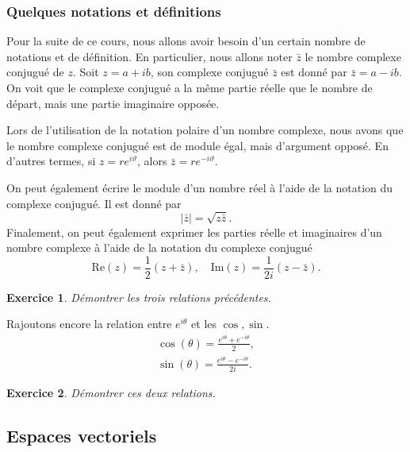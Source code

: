 \documentclass[a4paper,12pt]{book}
\newcommand{\zbar}{\bar{z}}
\renewcommand{\Re}{\mathrm{Re}}
\renewcommand{\Im}{\mathrm{Im}}
\newtheorem*{exercice}{Exercice}
\begin{document}
\subsubsection{Quelques notations et définitions}

Pour la suite de ce cours, nous allons avoir besoin d'un certain nombre 
de notations et de définition. En particulier, nous allons noter $\bar{z}$
le nombre complexe conjugu\'e de $z$. Soit $z=a+ib$, son complexe conjugué $\zbar$
est donné par $\zbar=a-ib$. On voit que le complexe conjugué a la même partie réelle
que le nombre de départ, mais une partie imaginaire opposée. 

Lors de l'utilisation de la notation polaire d'un nombre complexe, nous avons que le nombre complexe conjugué est 
de module égal, mais 
d'argument opposé. En d'autres termes, si $z=re^{i\vartheta}$, alors $\zbar=re^{-i\vartheta}$.


On peut également écrire le module d'un nombre réel à l'aide de la notation 
du complexe conjugué. Il est donné par 
\begin{equation}
 |\zbar|=\sqrt{z\zbar}.
\end{equation}
Finalement, on peut également exprimer les parties réelle et imaginaires d'un nombre complexe à l'aide 
de la notation du complexe conjugué
\begin{equation}
 \Re(z)=\frac{1}{2}(z+\zbar),\quad \Im(z)=\frac{1}{2i}(z-\zbar).
\end{equation}
\begin{exercice}
Démontrer les trois relations précédentes.
\end{exercice}
Rajoutons encore la relation entre $e^{i\theta}$ et les $\cos,\sin$. 
\begin{align}
 \cos(\theta)=\frac{e^{i\theta}+e^{-i\theta}}{2},\\
 \sin(\theta)=\frac{e^{i\theta}-e^{-i\theta}}{2i}.
\end{align}
\begin{exercice}
Démontrer ces deux relations.
\end{exercice}

\subsection{Espaces vectoriels}
\end{document}
